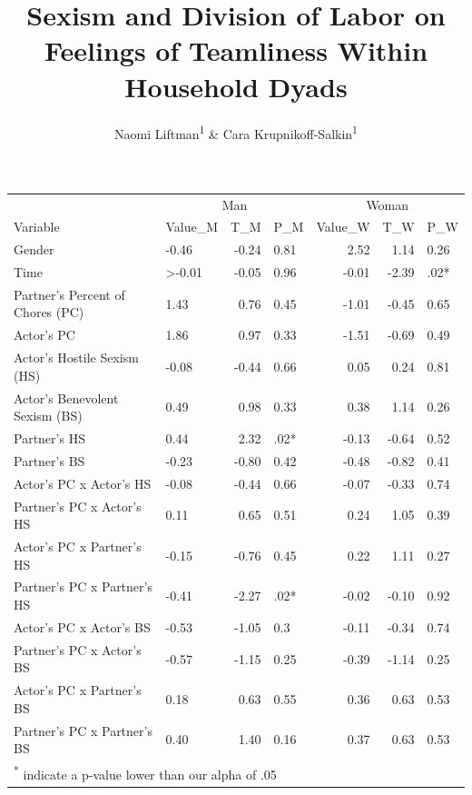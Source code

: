 \documentclass[
  english,
  man]{apa6}
\title{Sexism and Division of Labor on Feelings of Teamliness Within Household Dyads}
\author{Naomi Liftman\textsuperscript{1} \& Cara Krupnikoff-Salkin\textsuperscript{1}}
\date{}
\affiliation{\vspace{0.5cm}\textsuperscript{1} Smith College}
\begin{document}
\maketitle

\begin{tabular}{l|l|r|l|r|r|l}
\hline
\multicolumn{1}{c|}{ } & \multicolumn{3}{c|}{Man} & \multicolumn{3}{c}{Woman} \\
\cline{2-4} \cline{5-7}
Variable & Value\_M & T\_M & P\_M & Value\_W & T\_W & P\_W\\
\hline
Gender & -0.46 & -0.24 & 0.81 & 2.52 & 1.14 & 0.26\\
\hline
Time & >-0.01 & -0.05 & 0.96 & -0.01 & -2.39 & .02*\\
\hline
Partner's Percent of Chores (PC) & 1.43 & 0.76 & 0.45 & -1.01 & -0.45 & 0.65\\
\hline
Actor's PC & 1.86 & 0.97 & 0.33 & -1.51 & -0.69 & 0.49\\
\hline
Actor's Hostile Sexism (HS) & -0.08 & -0.44 & 0.66 & 0.05 & 0.24 & 0.81\\
\hline
Actor's Benevolent Sexism (BS) & 0.49 & 0.98 & 0.33 & 0.38 & 1.14 & 0.26\\
\hline
Partner's HS & 0.44 & 2.32 & .02* & -0.13 & -0.64 & 0.52\\
\hline
Partner's BS & -0.23 & -0.80 & 0.42 & -0.48 & -0.82 & 0.41\\
\hline
Actor's PC x Actor's HS & -0.08 & -0.44 & 0.66 & -0.07 & -0.33 & 0.74\\
\hline
Partner's PC x Actor's HS & 0.11 & 0.65 & 0.51 & 0.24 & 1.05 & 0.39\\
\hline
Actor's PC x Partner's HS & -0.15 & -0.76 & 0.45 & 0.22 & 1.11 & 0.27\\
\hline
Partner's PC x Partner's HS & -0.41 & -2.27 & .02* & -0.02 & -0.10 & 0.92\\
\hline
Actor's PC x Actor's BS & -0.53 & -1.05 & 0.3 & -0.11 & -0.34 & 0.74\\
\hline
Partner's PC x Actor's BS & -0.57 & -1.15 & 0.25 & -0.39 & -1.14 & 0.25\\
\hline
Actor's PC x Partner's BS & 0.18 & 0.63 & 0.55 & 0.36 & 0.63 & 0.53\\
\hline
Partner's PC x Partner's BS & 0.40 & 1.40 & 0.16 & 0.37 & 0.63 & 0.53\\
\hline
\multicolumn{7}{l}{\textsuperscript{*} indicate a p-value lower than our alpha of .05}\\
\end{tabular}
\end{document}
